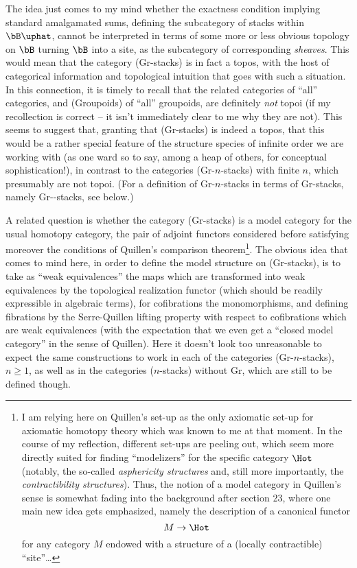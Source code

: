 The idea just comes to my mind whether the exactness condition
implying standard amalgamated sums, defining the subcategory of stacks
within $\bB\uphat$, cannot be interpreted in terms of some more
or less obvious topology on $\bB$ turning $\bB$ into a site, as
the subcategory of corresponding \emph{sheaves}. This would mean that
the category (Gr-stacks) is in fact a topos, with the host of
categorical information and topological intuition that goes with such
a situation. In this connection, it is timely to recall that the
related categories \Cat{} of ``all'' categories, and (Groupoids) of
``all'' groupoids, are definitely \emph{not} topoi (if my recollection
is correct -- it isn't immediately clear to me why they are not). This
seems to suggest that, granting that (Gr-stacks) is indeed a topos,
that this would be a rather special feature of the structure species
of infinite order we are working with (as one ward so to say, among a
heap of others, for conceptual sophistication!), in contrast to the
categories (Gr-$n$-stacks) with finite $n$, which presumably are not
topoi. (For a definition of Gr-$n$-stacks in terms of Gr-stacks,
namely Gr-\oo-stacks, see below.)

A related question is whether the category (Gr-stacks) is a model
category for the usual homotopy category, the pair of adjoint functors
considered before satisfying moreover the conditions of Quillen's
comparison theorem\footnote{I am relying here on Quillen's set-up as the only axiomatic set-up for axiomatic homotopy theory which was known to me at that moment. In the course of my reflection, different set-ups are peeling out, which seem more directly suited for finding ``modelizers'' for the specific category $\Hot$ (notably, the so-called \emph{asphericity structures} and, still more importantly, the \emph{contractibility structures}). Thus, the notion of a model category in Quillen's sense is somewhat fading into the background after section 23, where one main new idea gets emphasized, namely the description of a canonical functor $$M \to \Hot$$ for any category $M$ endowed with a structure of a (locally contractible) ``site''\dots}. The obvious idea that comes to mind here, in order
to define the model structure on (Gr-stacks), is to take as ``weak
equivalences'' the maps which are transformed into weak equivalences
by the topological realization functor (which should be readily
expressible in algebraic terms), for cofibrations the monomorphisms,
and defining fibrations by the Serre-Quillen lifting property with
respect to cofibrations which are weak equivalences (with the
expectation that we even get a ``closed model category'' in the sense
of Quillen). Here it doesn't look too unreasonable to expect the same
constructions to work in each of the categories (Gr-$n$-stacks),
$n\ge1$, as well as in the categories ($n$-stacks) without Gr, which
are still to be defined though.

